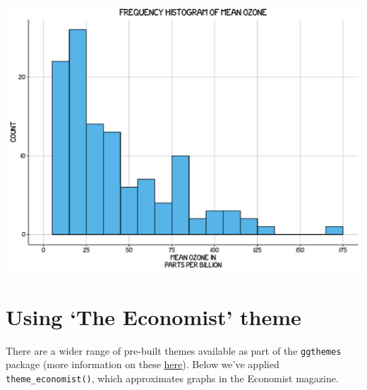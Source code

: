 \begin{center}\includegraphics[width=0.55\linewidth]{figures/histogram_14-1} \end{center}

\section{\texorpdfstring{Using `The Economist'
theme}{Using The Economist theme}}\label{using-the-economist-theme-6}

There are a wider range of pre-built themes available as part of the
\texttt{ggthemes} package (more information on these
\href{https://cran.r-project.org/web/packages/ggthemes/vignettes/ggthemes.html}{here}).
Below we've applied \texttt{theme\_economist()}, which approximates
graphs in the Economist magazine.

